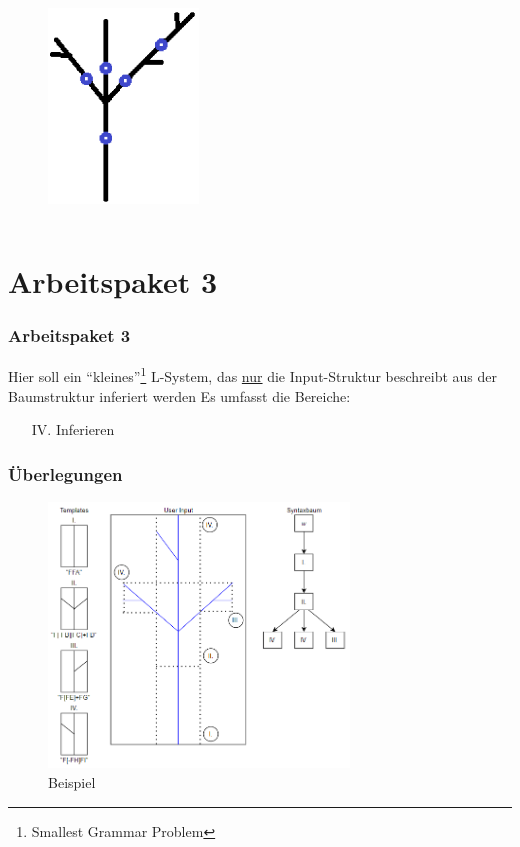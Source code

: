 \documentclass[12pt]{beamer}
\begin{document}
\begin{frame}
\begin{columns}
            \begin{column}{0.5\textwidth}
                \begin{figure}
                    \centering
                    \includegraphics[width=4cm]{../images/Tree_1.PNG}
                \end{figure}
            \end{column}
        \end{columns}
    \end{frame}

    \section{Arbeitspaket 3}
    \label{sec:3}

    \begin{frame}
        \frametitle{Arbeitspaket 3}
        Hier soll ein "`kleines"'\footnote{Smallest Grammar Problem} L-System, das \underline{nur} die Input-Struktur beschreibt aus der
        Baumstruktur
        inferiert werden Es umfasst die Bereiche:
        \begin{itemize}
            \item[IV.] Inferieren
        \end{itemize}
    \end{frame}

    \begin{frame}
        \frametitle{Überlegungen}
        \begin{figure}
            \centering
            \includegraphics[width=8cm]{../images/Beispiel_1.PNG}
            \caption{Beispiel}
        \end{figure}
    \end{frame}
\end{document}
